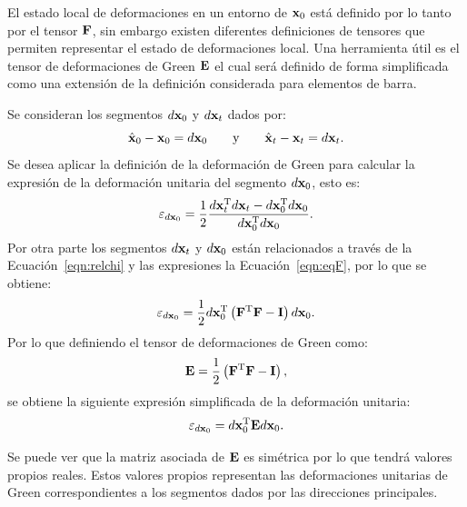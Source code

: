 El estado local de deformaciones en un entorno de ${\bf x}_0$ está definido por lo tanto por el tensor ${\bf F}$, sin embargo existen diferentes definiciones de tensores que permiten representar el estado de deformaciones local. %
%
Una herramienta útil es el tensor de deformaciones de Green ${\bf E}$ el cual será definido de forma simplificada como una extensión de la definición considerada para elementos de barra. %
%

Se consideran los segmentos $d{\bf x}_0$ y $d{\bf x}_t$ dados por:
\begin{equation}\label{eqn:relF}
\hat{{\bf x}}_0 - {\bf x}_0 = d{\bf x}_0 \qquad \text{y} \qquad \hat{{\bf x}}_t -{\bf x}_t = d{\bf x}_t.
\end{equation}
%
Se desea aplicar la definición de la deformación de Green para calcular la expresión de la deformación unitaria del segmento $d{\bf x}_0$, esto es:
%
\begin{equation}
\varepsilon_{d{\bf x}_0} = \frac{1}{2} \frac{d{\bf x}_t^{\text{T}} d{\bf x}_t - d{\bf x}_0^{\text{T}} d{\bf x}_0} {d{\bf x}_0^{\text{T}} d{\bf x}_0}.
\end{equation}
%
Por otra parte los segmentos $d{\bf x}_t$ y $d{\bf x}_0$ están relacionados a través de la Ecuación~\eqref{eqn:relchi} y las expresiones la Ecuación~\eqref{eqn:eqF}, por lo que se obtiene:
%
\begin{equation}
\varepsilon_{d{\bf x}_0} = \frac{1}{2} d{\bf x}_0^{\text{T}} \left( {\bf F}^{\text{T}} {\bf F} - {\bf I}\right) d{\bf x}_0.
\end{equation}
%
Por lo que definiendo el tensor de deformaciones de Green como:
%
\begin{equation}
{\bf E} = \frac{1}{2} \left( {\bf F}^{\text{T}} {\bf F} - {\bf I}\right),
\end{equation}
%
se obtiene la siguiente expresión simplificada de la deformación unitaria:
\begin{equation}
\varepsilon_{d{\bf x}_0} = d{\bf x}_0^{\text{T}} {\bf E} d{\bf x}_0.
\end{equation}

Se puede ver que la matriz asociada de ${\bf E}$ es simétrica por lo que tendrá valores propios reales. %
%
Estos valores propios representan las deformaciones unitarias de Green correspondientes a los segmentos dados por las direcciones principales. %

